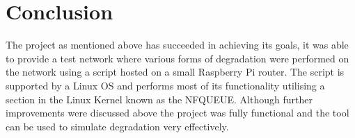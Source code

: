 \chapter{Conclusion}

The project as mentioned above has succeeded in achieving its goals, it was able to provide a test network where various forms of degradation were performed on the network using a script hosted on a small Raspberry Pi router. The script is supported by a Linux OS and performs most of its functionality utilising a section in the Linux Kernel known as the NFQUEUE. Although further improvements were discussed above the project was fully functional and the tool can be used to simulate degradation very effectively.